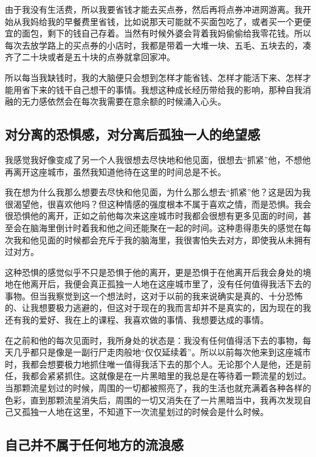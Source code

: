 由于我没有生活费，所以我要省钱才能去买点券，然后再将点券冲进网游离。我开始从我妈给我的早餐费里省钱，比如说那天可能就不买面包吃了，或者买一个更便宜的面包，剩下的钱自己存着。当然有时候外婆会背着我妈偷偷给我零花钱。所以每次去放学路上的买点券的小店时，我都是带着一大堆一块、五毛、五块去的，凑齐了二十块或者是五十块的点券就拿回家冲。

所以每当我缺钱时，我的大脑便只会想到怎样才能省钱、怎样才能活下来、怎样才能用省下来的钱干自己想干的事情。我想这种成长经历带给我的影响，那种自我消融的无力感依然会在每次我需要在意余额的时候涌入心头。


\subsection*{对分离的恐惧感，对分离后孤独一人的绝望感}

我感觉我好像变成了另一个人\pozhehao{}我很想去尽快地和他见面，很想去“抓紧”他，不想他再离开这座城市，虽然我知道他待在这里的时间总是不长。

我在想为什么我那么想要去尽快和他见面，为什么那么想去“抓紧”他？这是因为我很渴望他，很喜欢他吗？但这种情感的强度根本不属于喜欢之情，而是恐惧。我会很恐惧他的离开，正如之前他每次来这座城市时我都会很想有更多见面的时间，甚至会在脑海里倒计时着我和他之间还能聚在一起的时间。这种患得患失的感觉在每次我和他见面的时候都会充斥于我的脑海里，我很害怕失去对方，即使我从未拥有过对方。

这种恐惧的感觉似乎不只是恐惧于他的离开，更是恐惧于在他离开后我会身处的境地\pozhehao{}在他离开后，我便会真正孤独一人地在这座城市里了，没有任何值得我活下去的事物。但当我察觉到这一个想法时，这对于以前的我来说确实是真的、十分恐怖的、让我想要极力逃避的，但这对于现在的我而言却并不是真实的，因为现在的我还有我的爱好、我在上的课程、我喜欢做的事情、我想要达成的事情。

在之前和他的每次见面时，我所身处的状态是：我没有任何值得活下去的事物，每天几乎都只是像是一副行尸走肉般地“仅仅延续着”。所以以前每次他来到这座城市时，我都会想要极力地抓住唯一值得我活下去的那个人。无论那个人是他，还是前任，我都会紧紧抓住。这就像是在一片黑暗里的我总是在等待着一颗流星的划过。当那颗流星划过的时候，周围的一切都被照亮了，我的生活也就充满着各种各样的色彩，直到那颗流星消失后，周围的一切又消失在了一片黑暗当中，我再次发现自己又孤独一人地在这里，不知道下一次流星划过的时候会是什么时候。


\subsection*{自己并不属于任何地方的流浪感}

